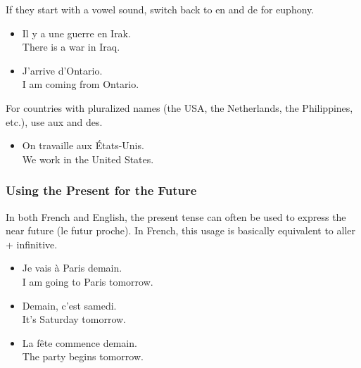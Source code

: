 If they start with a vowel sound, switch back to en and de for euphony.

\begin{itemize}
  \item  Il y a une guerre en Irak. \\ There is a war in Iraq.
  \item  J'arrive d'Ontario. \\ I am coming from Ontario.
\end{itemize}

For countries with pluralized names (the USA, the Netherlands, the Philippines, etc.), use aux and des.

\begin{itemize}
  \item  On travaille aux {\'E}tats-Unis. \\ We work in the United States.
\end{itemize}

\subsubsection{Using the Present for the Future}

In both French and English, the present tense can often be used to express the near future (le futur proche). In French, this usage is basically equivalent to aller + infinitive.

\begin{itemize}
  \item  Je vais {\`a} Paris demain. \\ I am going to Paris tomorrow.
  \item  Demain, c'est samedi. \\ It's Saturday tomorrow.
  \item  La f{\^e}te commence demain. \\ The party begins tomorrow.
\end{itemize}

